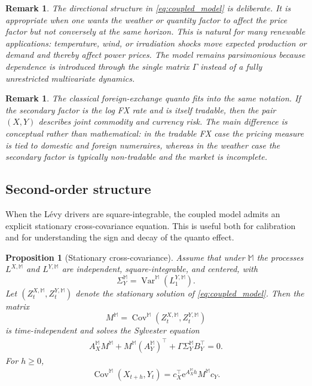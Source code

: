 \documentclass[10pt,reqno]{amsart}
\newtheorem{proposition}[theorem]{Proposition}
\newtheorem{remark}[theorem]{Remark}
\newcommand{\1}{\mathbbm{1}}
\newcommand{\ee}{\mathrm{e}}
\DeclareMathOperator{\Cov}{Cov}
\DeclareMathOperator{\Var}{Var}
\begin{document}
\begin{remark}
The directional structure in \eqref{eq:coupled_model} is deliberate. It is
appropriate when one wants the weather or quantity factor to affect the price
factor but not conversely at the same horizon. This is natural for many
renewable applications: temperature, wind, or irradiation shocks move expected
production or demand and thereby affect power prices. The model remains
parsimonious because dependence is introduced through the single matrix
$\Gamma$ instead of a fully unrestricted multivariate dynamics.
\end{remark}

\begin{remark}
The classical foreign-exchange quanto fits into the same notation. If the
secondary factor is the log FX rate and is itself tradable, then the pair
$(X,Y)$ describes joint commodity and currency risk. The main difference is
conceptual rather than mathematical: in the tradable FX case the pricing measure
is tied to domestic and foreign numeraires, whereas in the weather case the
secondary factor is typically non-tradable and the market is incomplete.
\end{remark}

\subsection{Second-order structure}

When the Lévy drivers are square-integrable, the coupled model admits an
explicit stationary cross-covariance equation. This is useful both for
calibration and for understanding the sign and decay of the quanto effect.

\begin{proposition}[Stationary cross-covariance]
\label{prop:cross_covariance}
Assume that under $\mathbb{M}$ the processes $L^{X,\mathbb{M}}$ and
$L^{Y,\mathbb{M}}$ are independent, square-integrable, and centered, with
$$
\Sigma_Y^{\mathbb{M}} = \Var^{\mathbb{M}}(L_1^{Y,\mathbb{M}}).
$$
Let $(Z_t^{X,\mathbb{M}},Z_t^{Y,\mathbb{M}})$ denote the stationary solution
of \eqref{eq:coupled_model}. Then the matrix
$$
M^{\mathbb{M}} = \Cov^{\mathbb{M}}(Z_t^{X,\mathbb{M}}, Z_t^{Y,\mathbb{M}})
$$
is time-independent and solves the Sylvester equation
\begin{align}\label{eq:sylvester_cross_cov}
  A_X^{\mathbb{M}} M^{\mathbb{M}}
  + M^{\mathbb{M}} (A_Y^{\mathbb{M}})^\top
  + \Gamma \Sigma_Y^{\mathbb{M}} B_Y^\top
  = 0.
\end{align}
For $h \ge 0$,
\begin{align}\label{eq:lagged_cross_cov}
  \Cov^{\mathbb{M}}(X_{t+h},Y_t)
  = c_X^\top
      \ee^{A_X^{\mathbb{M}} h}
      M^{\mathbb{M}}
      c_Y.
\end{align}
\end{proposition}
\end{document}
